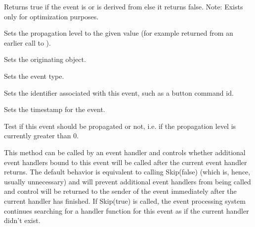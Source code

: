 \label{wxeventiscommandevent}


Returns true if the event is or is derived from
 else it returns false.
Note: Exists only for optimization purposes.


\label{wxeventresumepropagation}


Sets the propagation level to the given value (for example returned from an
earlier call to ).


\label{wxeventseteventobject}


Sets the originating object.


\label{wxeventseteventtype}


Sets the event type.


\label{wxeventsetid}


Sets the identifier associated with this event, such as a button command id.


\label{wxeventsettimestamp}


Sets the timestamp for the event.


\label{wxeventshouldpropagate}


Test if this event should be propagated or not, i.e. if the propagation level
is currently greater than $0$.


\label{wxeventskip}


This method can be called by an event handler and controls whether additional
event handlers bound to this event will be called after the current event
handler returns. The default behavior is equivalent to calling Skip(false)
(which is, hence, usually unnecessary) and will prevent additional event
handlers from being called and control will be returned to the sender of the
event immediately after the current handler has finished. If Skip(true) is
called, the event processing system continues searching for a handler
function for this event as if the current handler didn't exist.

